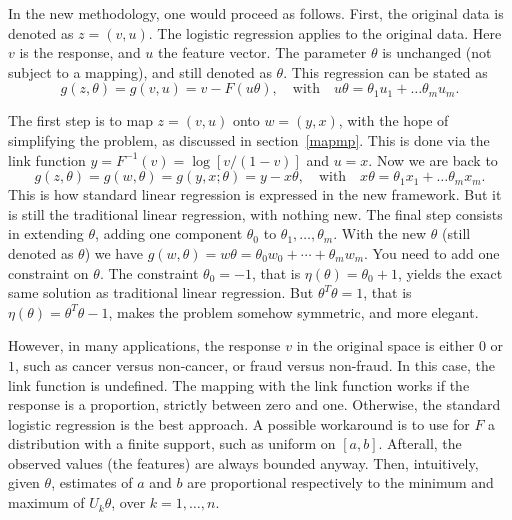 \documentclass[oneside,10pt]{book}
\begin{document}
In the new methodology, one would proceed as follows. First, the original data is denoted as $z=(v,u)$. The logistic regression applies to the original data. Here $v$ is the response,
 and $u$ the feature vector. The parameter $\theta$ is unchanged (not subject to a mapping), and still denoted as $\theta$.  This regression can be stated as
$$
g(z,\theta)=g(v,u)= v-F(u\theta), \quad \text{with } \text{ } u\theta=\theta_1 u_1 + \dots \theta_m u_m.
$$

The first step is to map $z=(v,u)$ onto $w=(y,x)$, with the hope of simplifying the problem, as discussed in section~\ref{mapmp}. This is done
 via the \textcolor{index}{link function} $y=F^{-1}(v)=\log[v/(1-v)]$ and $u=x$. Now we are back to
$$
g(z,\theta)=g(w,\theta)=g(y,x;\theta)= y-x\theta, \quad \text{with } \text{ } x\theta=\theta_1 x_1 + \dots \theta_m x_m.
$$
This is how standard linear regression is expressed in the new framework. But it is still the traditional linear regression, with nothing new. The final step
 consists in extending $\theta$, adding one component $\theta_0$ to $\theta_1,\dots,\theta_m$. With the new $\theta$ (still denoted as $\theta$) we have $g(w,\theta)=w\theta=\theta_0 w_0+\cdots + \theta_m w_m$. You need to add one constraint on $\theta$. The constraint $\theta_0=-1$,
 that is $\eta(\theta)=\theta_0+1$, yields the exact same solution as traditional linear regression. But $\theta^T\theta=1$, that is $\eta(\theta)=\theta^T\theta-1$, makes the problem somehow symmetric, and more elegant.

However, in many applications, the response $v$ in the original space is either $0$ or $1$, such as cancer versus non-cancer, or fraud versus non-fraud.  In this case, the link function is undefined. The mapping with the link function works if the response is a proportion, strictly between zero and one. Otherwise, the standard logistic regression  is the best approach.
 A possible workaround is to use for $F$ a distribution with a finite support, such as uniform on $[a,b]$. Afterall, the observed values (the features) are always bounded anyway. Then, intuitively, given $\theta$, estimates of $a$ and $b$ are proportional respectively to the minimum and maximum of $U_k\theta$, over $k=1,\dots,n$.
\end{document}
